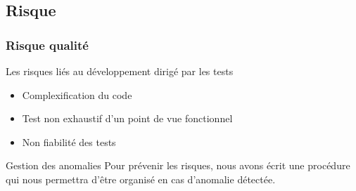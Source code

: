 
\subsection{Risque}
\begin{frame}
  \frametitle{\color{white} Risque qualité}
  \begin{block}{Les risques liés au développement dirigé par les tests}
    \begin{itemize}
      \item Complexification du code
      \item Test non exhaustif d'un point de vue fonctionnel
      \item Non fiabilité des tests
  \end{itemize}
  \end{block}
  \begin{block}{Gestion des anomalies}
    Pour prévenir les risques, nous avons écrit une procédure qui nous permettra d'être organisé en cas d'anomalie détectée.
  \end{block}

\end{frame}


